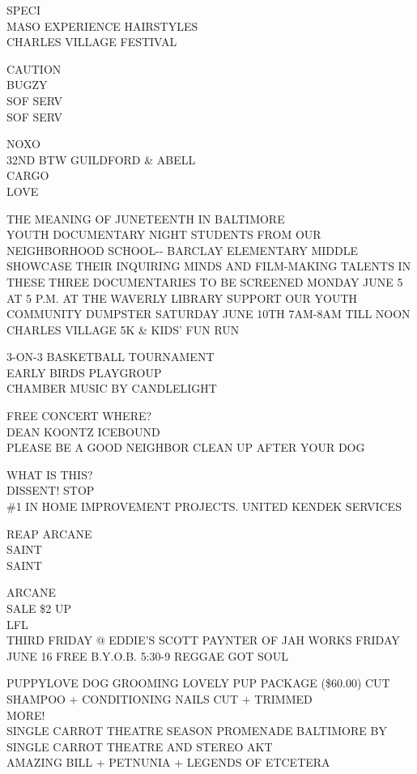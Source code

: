 \documentclass[10pt,letterpaper]{article}
\begin{document}
SPECI\\
MASO EXPERIENCE HAIRSTYLES\\
CHARLES VILLAGE FESTIVAL

CAUTION\\
BUGZY\\
SOF SERV\\
SOF SERV

NOXO\\
32ND BTW GUILDFORD \& ABELL\\
CARGO\\
LOVE

THE MEANING OF JUNETEENTH IN BALTIMORE\\
YOUTH DOCUMENTARY NIGHT STUDENTS FROM OUR NEIGHBORHOOD SCHOOL{-}{-} BARCLAY ELEMENTARY MIDDLE  SHOWCASE THEIR INQUIRING MINDS AND FILM{-}MAKING TALENTS IN THESE THREE DOCUMENTARIES TO BE SCREENED MONDAY JUNE 5 AT 5 P.M. AT THE WAVERLY LIBRARY SUPPORT OUR YOUTH\\
COMMUNITY DUMPSTER SATURDAY JUNE 10TH 7AM{-}8AM TILL NOON\\
CHARLES VILLAGE 5K \& KIDS' FUN RUN

3{-}ON{-}3 BASKETBALL TOURNAMENT\\
EARLY BIRDS PLAYGROUP\\
CHAMBER MUSIC BY CANDLELIGHT

FREE CONCERT WHERE?\\
DEAN KOONTZ ICEBOUND\\
PLEASE BE A GOOD NEIGHBOR CLEAN UP AFTER YOUR DOG

WHAT IS THIS?\\
DISSENT! STOP\\
\#1 IN HOME IMPROVEMENT PROJECTS.  UNITED KENDEK SERVICES

REAP ARCANE\\
SAINT\\
SAINT

ARCANE\\
SALE \$2 UP\\
LFL\\
THIRD FRIDAY @ EDDIE'S SCOTT PAYNTER OF JAH WORKS FRIDAY JUNE 16 FREE B.Y.O.B. 5:30{-}9 REGGAE GOT SOUL

PUPPYLOVE DOG GROOMING LOVELY PUP PACKAGE (\$60.00) CUT SHAMPOO + CONDITIONING NAILS CUT + TRIMMED\\
MORE!\\
SINGLE CARROT THEATRE SEASON PROMENADE BALTIMORE BY SINGLE CARROT THEATRE AND STEREO AKT\\
AMAZING BILL + PETNUNIA + LEGENDS OF ETCETERA
\end{document}
